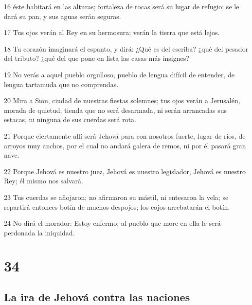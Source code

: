 \par 16 éste habitará en las alturas; fortaleza de rocas será su lugar de refugio; se le dará su pan, y sus aguas serán seguras.
\par 17 Tus ojos verán al Rey en su hermosura; verán la tierra que está lejos.
\par 18 Tu corazón imaginará el espanto, y dirá: ¿Qué es del escriba? ¿qué del pesador del tributo? ¿qué del que pone en lista las casas más insignes?
\par 19 No verás a aquel pueblo orgulloso, pueblo de lengua difícil de entender, de lengua tartamuda que no comprendas.
\par 20 Mira a Sion, ciudad de nuestras fiestas solemnes; tus ojos verán a Jerusalén, morada de quietud, tienda que no será desarmada, ni serán arrancadas sus estacas, ni ninguna de sus cuerdas será rota. 
\par 21 Porque ciertamente allí será Jehová para con nosotros fuerte, lugar de ríos, de arroyos muy anchos, por el cual no andará galera de remos, ni por él pasará gran nave.
\par 22 Porque Jehová es nuestro juez, Jehová es nuestro legislador, Jehová es nuestro Rey; él mismo nos salvará.
\par 23 Tus cuerdas se aflojaron; no afirmaron su mástil, ni entesaron la vela; se repartirá entonces botín de muchos despojos; los cojos arrebatarán el botín.
\par 24 No dirá el morador: Estoy enfermo; al pueblo que more en ella le será perdonada la iniquidad.


\chapter{34}

\section*{La ira de Jehová contra las naciones}

